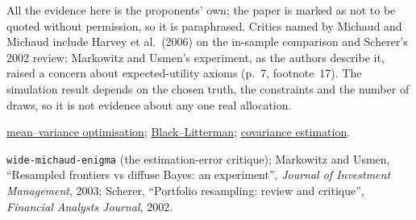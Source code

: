 \begin{qfmethod}
 All the evidence here is the proponents' own; the paper is marked as not to be quoted without permission, so it is paraphrased. Critics named by Michaud and Michaud include Harvey et al.\ (2006) on the in-sample comparison and Scherer's 2002 review; Markowitz and Usmen's experiment, as the authors describe it, raised a concern about expected-utility axioms (p.~7, footnote~17). The simulation result depends on the chosen truth, the constraints and the number of draws, so it is not evidence about any one real allocation.

 \hyperref[mod:mean-variance-portfolio-optimisation]{mean--variance optimisation}; \hyperref[mod:black-litterman]{Black--Litterman}; \hyperref[meth:portfolio-covariance-estimation]{covariance estimation}.

 \nolinkurl{wide-michaud-enigma} (the estimation-error critique); Markowitz and Usmen, ``Resampled frontiers vs diffuse Bayes: an experiment'', \emph{Journal of Investment Management}, 2003; Scherer, ``Portfolio resampling: review and critique'', \emph{Financial Analysts Journal}, 2002.

\end{qfmethod}

